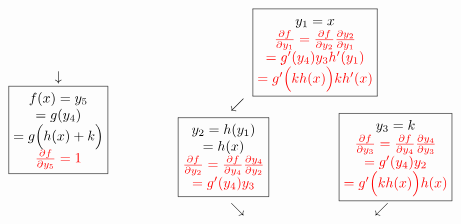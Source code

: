 \begin{equation*}
\begin{matrix}
\begin{matrix}
{\begin{matrix}
        \end{matrix}} \\
        \downarrow \\
        \boxed{\begin{matrix}
            f(x) = y_5 \\
            = g(y_4) \\
            = g\Bigl(h(x) + k\Bigr) \\
            \color{red}{\frac{\partial f}{\partial y_5} = 1}
        \end{matrix}}
    \end{matrix} \qquad & \qquad
    \begin{matrix}
        \boxed{\begin{matrix}
            y_1=x \\
            \color{red}{\frac{\partial f}{\partial y_1} = \frac{\partial f}{\partial y_2}\frac{\partial y_2}{\partial y_1}} \\
            \color{red}{= g'(y_4)y_3 h'(y_1)} \\
            \color{red}{= g'\Bigl(kh(x)\Bigr)kh'(x)}
        \end{matrix}} \\
        \begin{matrix}
            \swarrow \\
            \boxed{\begin{matrix}
                y_2=h(y_1) \\
                =h(x) \\
                \color{red}{\frac{\partial f}{\partial y_2} = \frac{\partial f}{\partial y_4}\frac{\partial y_4}{\partial y_2}} \\
                \color{red}{= g'(y_4)y_3}
            \end{matrix}} \qquad & \qquad
            \boxed{\begin{matrix}
                y_3=k \\
                \color{red}{\frac{\partial f}{\partial y_3} = \frac{\partial f}{\partial y_4}\frac{\partial y_4}{\partial y_3}} \\
                \color{red}{= g'(y_4)y_2} \\
                \color{red}{= g'\Bigl(k h(x)\Bigr)h(x)}
            \end{matrix}} \\
            \searrow & \swarrow \\
        \end{matrix} \\

\end{matrix}
\end{matrix}
\end{equation*}
